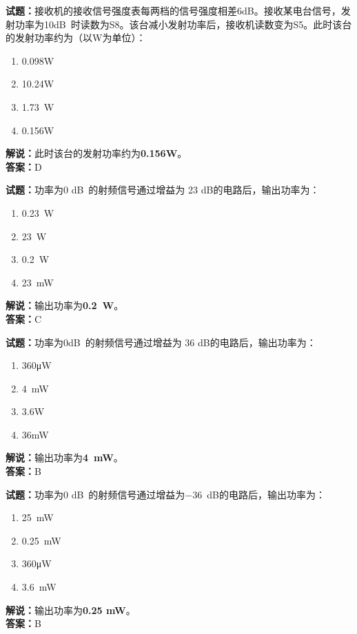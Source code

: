 \documentclass{ctexbook}
\begin{document}
\bigskip


\noindent\textbf{试题：}接收机的接收信号强度表每两档的信号强度相差6dB。接收某电台信号，发射功率为10\unit[qualifier-mode=combine]{\deci\bel{}}时读数为S8。该台减小发射功率后，接收机读数变为S5。此时该台的发射功率约为（以W为单位）：
\begin{enumerate}[leftmargin=3em]
\item 0.098W
\item 10.24W
\item \SI{1.73}{\W}
\item 0.156W
\end{enumerate}
\noindent\textbf{解说：}此时该台的发射功率约为\textbf{0.156W}。\\\noindent\textbf{答案：}D





\bigskip


\noindent\textbf{试题：}功率为0 \unit[qualifier-mode=combine]{\deci\bel{}}的射频信号通过增益为 23 dB的电路后，输出功率为：
\begin{enumerate}[leftmargin=3em]
\item \SI{0.23}{\W}
\item \SI{23}{\W}
\item \SI{0.2}{\W}
\item \SI{23}{\mW}
\end{enumerate}
\noindent\textbf{解说：}输出功率为\textbf{\SI{0.2}{\W}}。\\\noindent\textbf{答案：}C



\bigskip


\noindent\textbf{试题：}功率为0\unit[qualifier-mode=combine]{\deci\bel{}}的射频信号通过增益为 36 dB的电路后，输出功率为：
\begin{enumerate}[leftmargin=3em]
\item 360μW
\item \SI{4}{\mW}
\item 3.6W
\item 36mW
\end{enumerate}
\noindent\textbf{解说：}输出功率为\textbf{\SI{4}{\mW}}。\\\noindent\textbf{答案：}B


\bigskip


\noindent\textbf{试题：}功率为0 \unit[qualifier-mode=combine]{\deci\bel{}}的射频信号通过增益为\SI{-36}{\dB}的电路后，输出功率为：
\begin{enumerate}[leftmargin=3em]
\item \SI{25}{\mW}
\item \SI{0.25}{\mW}
\item 360μW
\item \SI{3.6}{\mW}
\end{enumerate}
\noindent\textbf{解说：}输出功率为\textbf{0.25 mW}。\\\noindent\textbf{答案：}B
\end{document}
